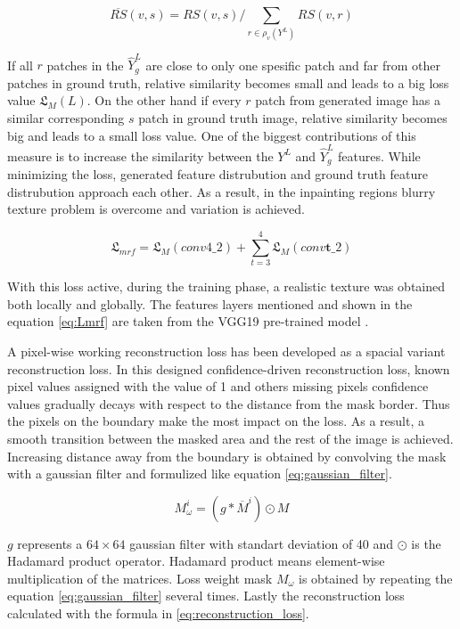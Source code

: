 \begin{equation}
    \overline{RS}(v,s) = RS(v,s) / \sum_{r \in \rho_{v}(Y^{L})} RS(v,r)
    \label{eq:normalized_rs}
\end{equation}

If all \(r\) patches in the \(\widehat{Y}_{g}^{L}\) are close to only one spesific patch and far from other patches in ground truth, relative similarity becomes small and leads to a big loss value \(\mathfrak{L}_{M}(L)\). On the other hand if every \(r\) patch from generated image has a similar corresponding \(s\) patch in ground truth image, relative similarity becomes big and leads to a small loss value. One of the biggest contributions of this measure is to increase the similarity between the \(Y^{L}\) and \(\widehat{Y}_{g}^{L}\) features. While minimizing the loss, generated feature distrubution and ground truth feature distrubution approach each other. As a result, in the inpainting regions blurry texture problem is overcome and variation is achieved.

\begin{equation}
    \mathfrak{L}_{mrf} = \mathfrak{L}_{M}(conv4 \_ 2) + \sum_{t = 3}^{4} \mathfrak{L}_{M}(conv \mathbf{t} \_ 2)
    \label{eq:Lmrf}
\end{equation}

With this loss active, during the training phase, a realistic texture was obtained both locally and globally. The features layers mentioned and shown in the equation \ref{eq:Lmrf} are taken from the VGG19 pre-trained model \cite{very_deep_conv}.

A pixel-wise working reconstruction loss has been developed as a spacial variant reconstruction loss. In this designed confidence-driven reconstruction loss, known pixel values assigned with the value of 1 and others missing pixels confidence values gradually decays with respect to the distance from the mask border. Thus the pixels on the boundary make the most impact on the loss. As a result, a smooth transition between the masked area and the rest of the image is achieved. Increasing distance away from the boundary is obtained by convolving the mask with a gaussian filter and formulized like equation \ref{eq:gaussian_filter}.

\begin{equation}
    M_{\omega}^{i} = (g \ast \overline{M}^{i}) \odot M
    \label{eq:gaussian_filter}
\end{equation}

\(g\) represents a \(64 \times 64\) gaussian filter with standart deviation of 40 and \(\odot\) is the Hadamard product operator. Hadamard product means element-wise multiplication of the matrices. Loss weight mask \(M_{\omega}\) is obtained by repeating the equation \ref{eq:gaussian_filter} several times. Lastly the reconstruction loss calculated with the formula in \ref{eq:reconstruction_loss}.

